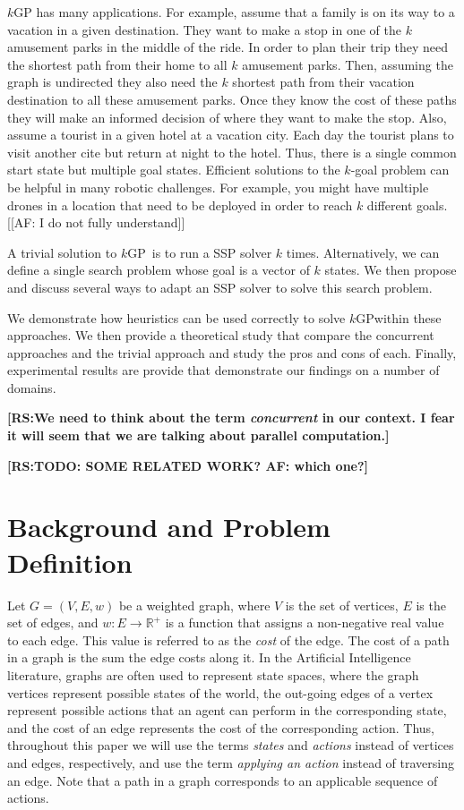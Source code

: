 \documentclass{aicom2e}
\newcommand{\kgs}{$k$GP}
\newcommand{\roni}[1]{\textbf{[RS:#1]}}
\begin{document}
\kgs{} has many applications. For example, assume that
a family is on its way to a vacation in a given destination. They want to make
a stop in one of the $k$ amusement parks in the middle of the ride. In order to
plan their trip they need the shortest path from their home to all $k$
amusement parks. Then, assuming the graph is undirected they also need the $k$
shortest path from their vacation destination to all these amusement parks.
Once they know the cost of these paths they will make an informed decision of
where they want to make the stop. Also, assume a tourist in a given hotel at a
vacation city. Each day the tourist plans to visit another cite but return at
night to the hotel. Thus, there is a single common start state but multiple
goal states. Efficient solutions to the $k$-goal problem can be helpful in many
robotic challenges. For example, you might have multiple drones in a location
that need to be deployed in order to reach $k$ different goals.[[AF: I do not
fully understand]]~\cite{DobsonB14}


A trivial solution to \kgs\ is to run a SSP solver $k$ times. 
Alternatively, we can define a single search problem whose goal 
is a vector of $k$ states. We then propose and discuss several ways to adapt an SSP solver to solve this search problem. 

We demonstrate how heuristics can be used correctly to solve \kgs within these
approaches. We then provide a theoretical study that compare the concurrent
approaches and the trivial approach and study the pros and cons of each.
Finally, experimental results are provide that demonstrate our findings on a
number of domains.

\roni{We need to think about the term {\em concurrent} in our context. I fear it will seem that we are talking about parallel computation.}

\roni{TODO: SOME RELATED WORK? AF: which one?}

\section{Background and Problem Definition}



Let $G=(V,E,w)$ be a weighted graph, where $V$ is the set of vertices, $E$ is the set of edges, and $w:E\rightarrow \mathbb{R}^+$ is a function that assigns a non-negative real value to each edge. This value is referred to as the {\em cost} of the edge. The cost of a path in a graph is the sum the edge costs along it. 
In the Artificial Intelligence literature, graphs are often used to represent state spaces, 
where the graph vertices represent possible states of the world, the out-going edges of a vertex represent possible actions that an agent can perform in the corresponding state, and the cost of an edge represents the cost of the corresponding action. 
Thus, throughout this paper we will use the terms {\em states} and {\em actions} instead of vertices and edges, respectively, and use the term {\em applying an action} instead of traversing an edge. Note that a path in a graph corresponds to an applicable sequence of actions.
\end{document}

